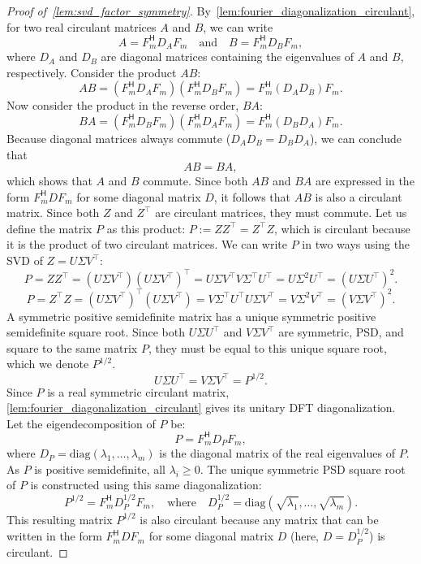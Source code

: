 \documentclass[11pt]{article}
\begin{document}
\begin{proof}[Proof of~\cref{lem:svd_factor_symmetry}]
By~\cref{lem:fourier_diagonalization_circulant}, for two real circulant matrices \(A\) and \(B\), we can write
\[ A = F_m^{\mathsf{H}} D_A F_m \quad \text{and} \quad B = F_m^{\mathsf{H}} D_B F_m, \]
where \(D_A\) and \(D_B\) are diagonal matrices containing the eigenvalues of \(A\) and \(B\), respectively.
Consider the product \(AB\):
\[ AB = (F_m^{\mathsf{H}} D_A F_m)(F_m^{\mathsf{H}} D_B F_m) = F_m^{\mathsf{H}} (D_A D_B) F_m. \]
Now consider the product in the reverse order, \(BA\):
\[ BA = (F_m^{\mathsf{H}} D_B F_m)(F_m^{\mathsf{H}} D_A F_m) = F_m^{\mathsf{H}} (D_B D_A) F_m. \]
Because diagonal matrices always commute (\(D_A D_B = D_B D_A\)), we can conclude that
\[ AB = BA, \]
which shows that \(A\) and \(B\) commute. Since both \(AB\) and \(BA\) are expressed in the form \(F_m^{\mathsf{H}} D F_m\) for some diagonal matrix \(D\), it follows that \(AB\) is also a circulant matrix.
Since both \(Z\) and \(Z^\top\) are circulant matrices, they must commute. Let us define the matrix \(P\) as this product: \(P := ZZ^\top = Z^\top Z\), which is circulant because it is the product of two circulant matrices.
We can write \(P\) in two ways using the SVD of \(Z = U\Sigma V^\top\):
\[ P = ZZ^\top = (U\Sigma V^\top)(U\Sigma V^\top)^\top = U\Sigma V^\top V \Sigma^\top U^\top = U\Sigma^2 U^\top = (U\Sigma U^\top)^2. \]
\[ P = Z^\top Z = (U\Sigma V^\top)^\top(U\Sigma V^\top) = V\Sigma^\top U^\top U \Sigma V^\top = V\Sigma^2 V^\top = (V\Sigma V^\top)^2. \]
A symmetric positive semidefinite matrix has a unique symmetric positive semidefinite square root. Since both \(U\Sigma U^\top\) and \(V\Sigma V^\top\) are symmetric, PSD, and square to the same matrix \(P\), they must be equal to this unique square root, which we denote \(P^{1/2}\).
\[ U\Sigma U^\top = V\Sigma V^\top = P^{1/2}. \]
Since \(P\) is a real symmetric circulant matrix, \cref{lem:fourier_diagonalization_circulant} gives its unitary DFT diagonalization. Let the eigendecomposition of \(P\) be:
\[
P = F_m^{\mathsf{H}} D_P F_m,
\]
where \(D_P = \mathrm{diag}(\lambda_1, \ldots, \lambda_m)\) is the diagonal matrix of the real eigenvalues of \(P\). As \(P\) is positive semidefinite, all \(\lambda_i \ge 0\). The unique symmetric PSD square root of \(P\) is constructed using this same diagonalization:
\[
P^{1/2} = F_m^{\mathsf{H}} D_P^{1/2} F_m, \quad \text{where} \quad D_P^{1/2} = \mathrm{diag}(\sqrt{\lambda_1}, \ldots, \sqrt{\lambda_m}).
\]
This resulting matrix \(P^{1/2}\) is also circulant because any matrix that can be written in the form \(F_m^{\mathsf{H}} D F_m\) for some diagonal matrix \(D\) (here, \(D = D_P^{1/2}\)) is circulant.
\end{proof}
\end{document}

